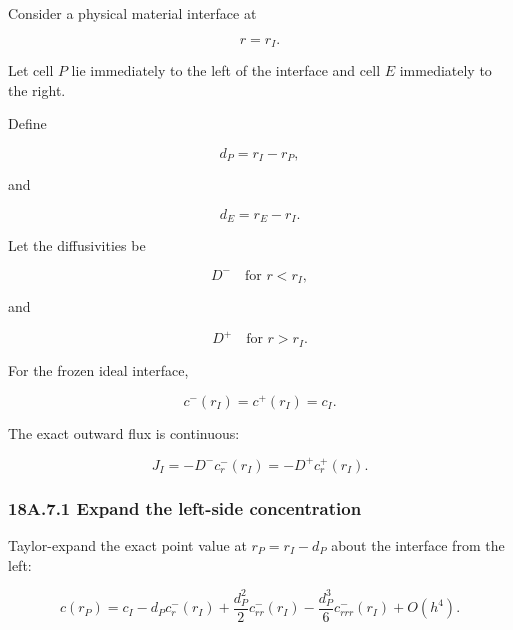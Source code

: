 \documentclass[11pt,a4paper]{article}
\begin{document}
Consider a physical material interface at

\begin{equation}
r=r_I.
\tag{TRISO-ACC-170}
\label{eq:triso-acc-170}
\end{equation}

Let cell $P$ lie immediately to the left of the interface and cell $E$ immediately to the right.

Define

\begin{equation}
d_P=r_I-r_P,
\tag{TRISO-ACC-171}
\label{eq:triso-acc-171}
\end{equation}

and

\begin{equation}
d_E=r_E-r_I.
\tag{TRISO-ACC-172}
\label{eq:triso-acc-172}
\end{equation}

Let the diffusivities be

\begin{equation}
D^- \quad\text{for }r<r_I,
\tag{TRISO-ACC-173}
\label{eq:triso-acc-173}
\end{equation}

and

\begin{equation}
D^+ \quad\text{for }r>r_I.
\tag{TRISO-ACC-174}
\label{eq:triso-acc-174}
\end{equation}

For the frozen ideal interface,

\begin{equation}
c^-(r_I)=c^+(r_I)=c_I.
\tag{TRISO-ACC-175}
\label{eq:triso-acc-175}
\end{equation}

The exact outward flux is continuous:

\begin{equation}
J_I
=
-D^-c_r^-(r_I)
=
-D^+c_r^+(r_I).
\tag{TRISO-ACC-176}
\label{eq:triso-acc-176}
\end{equation}

\subsubsection*{18A.7.1 Expand the left-side concentration}

Taylor-expand the exact point value at $r_P=r_I-d_P$ about the interface from the left:

\begin{equation}
c(r_P)
=
c_I
-
d_Pc_r^-(r_I)
+
\frac{d_P^2}{2}c_{rr}^-(r_I)
-
\frac{d_P^3}{6}c_{rrr}^-(r_I)
+
O(h^4).
\tag{TRISO-ACC-177}
\label{eq:triso-acc-177}
\end{equation}
\end{document}

